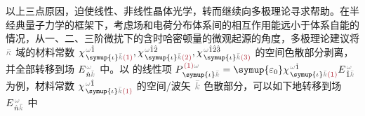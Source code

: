 以上三点原因，迫使线性、非线性晶体光学，转而继续向多极理论寻求帮助。在半经典量子力学的框架下，考虑场和电荷分布体系间的相互作用能远小于体系自能的情况，从一、二、三阶微扰下的含时哈密顿量的微观起源的角度，多极理论建议将 $\mathcolor{gray}{\bar{\kappa}}$ 域的材料常数 $\chi^{\;\! \mathcolor{gray}{\omega} \hat{1}}_{\;\! \symup{\iota} \mathcolor{gray}{\bar{k}} \textcolor{Maroon}{(1)}}, \chi^{\;\! \mathcolor{gray}{\omega} \hat{1} \hat{2}}_{\;\! \symup{\iota} \mathcolor{gray}{\bar{k}} \textcolor{Maroon}{(2)}}, \chi^{\;\! \mathcolor{gray}{\omega} \hat{1} \hat{2} \hat{3}}_{\;\! \symup{\iota} \mathcolor{gray}{\bar{k}} \textcolor{Maroon}{(3)}}$ 的空间色散部分剥离，并全部转移到场 $E^{\;\!\mathcolor{gray}{\omega}}_{\;\! \hat{n} \mathcolor{gray}{\bar{k}}}$ 中。以  的线性项 $P^{\;\! \textcolor{Maroon}{(1)} \mathcolor{gray}{\omega}}_{\;\! \symup{\iota}\mathcolor{gray}{\bar{k}}} = {\symup{\varepsilon_0}} \chi^{\;\! \mathcolor{gray}{\omega} \hat{1}}_{\;\! \symup{\iota} \mathcolor{gray}{\bar{k}} \textcolor{Maroon}{(1)}} E^{\;\!\mathcolor{gray}{\omega}}_{\;\! \hat{1} \mathcolor{gray}{\bar{k}}}$ 为例，材料常数 $\chi^{\;\! \mathcolor{gray}{\omega} \hat{1}}_{\;\! \symup{\iota} \mathcolor{gray}{\bar{k}} \textcolor{Maroon}{(1)}}$ 的空间/波矢 $\mathcolor{gray}{\bar{k}}$ 色散部分，可以如下地转移到场 $E^{\;\!\mathcolor{gray}{\omega}}_{\;\! \hat{n} \mathcolor{gray}{\bar{k}}}$ 中
